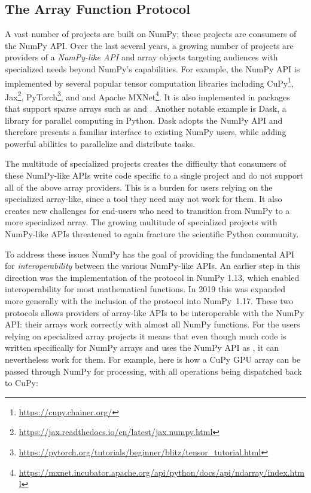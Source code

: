 \subsection*{The Array Function Protocol}

A vast number of projects are built on NumPy;
these projects are consumers of the NumPy API.
Over the last several years, a growing number of projects are providers of
a \emph{NumPy-like API} and array objects targeting audiences with specialized
needs beyond NumPy's capabilities.
For example, the NumPy API is implemented by several popular tensor computation
libraries including CuPy\footnote{\url{https://cupy.chainer.org/}},
Jax\footnote{\url{https://jax.readthedocs.io/en/latest/jax.numpy.html}},
PyTorch\footnote{\url{https://pytorch.org/tutorials/beginner/blitz/tensor\_tutorial.html}}, and
and Apache MXNet\footnote{\url{https://mxnet.incubator.apache.org/api/python/docs/api/ndarray/index.html}}.
It is also implemented in packages that support sparse arrays
such as  and .
Another notable example is Dask, a library for parallel computing in
Python.  Dask adopts the NumPy API and therefore presents a familiar
interface to existing NumPy users, while adding powerful abilities to
parallelize and distribute tasks.

The multitude of specialized projects creates the difficulty that consumers
of these NumPy-like APIs write code specific to a single project and do not support
all of the above array providers.
This is a burden for users relying on the specialized array-like, since
a tool they need may not work for them.
It also creates new challenges for end-users who need to transition
from NumPy to a more specialized array.
The growing multitude of specialized projects with NumPy-like APIs threatened
to again fracture the scientific Python community.

To address these issues NumPy has the goal of providing the fundamental
API for \emph{interoperability} between the various NumPy-like APIs.
An earlier step in this direction was the implementation of the
 protocol in NumPy 1.13, which enabled interoperability
for most mathematical functions.\cite{NEP13}
In 2019 this was expanded more generally with the inclusion of the
 protocol into NumPy~1.17.
These two protocols allows providers of array-like APIs to be interoperable
with the NumPy API: their arrays work correctly with almost all NumPy functions.\cite{NEP18}
For the users relying on specialized array projects it means that even though
much code is written specifically for NumPy arrays and uses the NumPy API as
, it can nevertheless work for them.  For
example, here is how a CuPy GPU array can be passed through NumPy for
processing, with all operations being dispatched back to CuPy:

